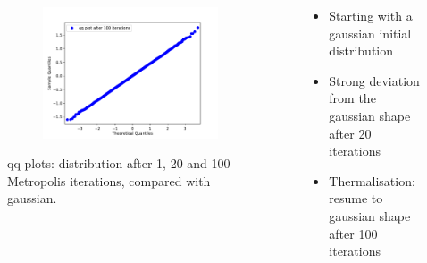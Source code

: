 \documentclass[aspectratio=169]{beamer}
\begin{document}
\begin{frame}
\begin{columns}
\begin{column}{0.6\textwidth}
\begin{figure}[H]
\begin{subfigure}[c]{0.49\textwidth}
				\end{subfigure}
				\begin{subfigure}[c]{0.49\textwidth}
					\includegraphics[width=\textwidth]{../imgs/harmonic_oscillator_track/track_10010000_qq_100.pdf}
				\end{subfigure}
				\caption{qq-plots: distribution after 1, 20 and 100 Metropolis iterations, compared with gaussian.}
				\label{fig:harmonic_oscillator_track_track_10010000_qqs}
			\end{figure}
		\end{column}
		\begin{column}{0.39\textwidth}
			\begin{itemize}
				\item Starting with a gaussian initial distribution
				\item Strong deviation from the gaussian shape after 20 iterations
				\item Thermalisation: resume to gaussian shape after 100 iterations
			\end{itemize}
		\end{column}
	\end{columns}
\end{frame}
\end{document}
